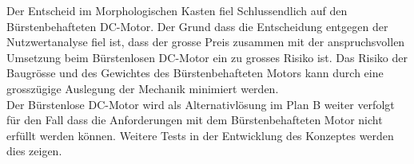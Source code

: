 \documentclass[../../main.tex]{subfiles}
\begin{document}
    Der Entscheid im Morphologischen Kasten fiel Schlussendlich auf den Bürstenbehafteten DC-Motor. Der Grund dass die Entscheidung entgegen der Nutzwertanalyse fiel ist, dass der grosse Preis zusammen mit der anspruchsvollen Umsetzung beim Bürstenlosen DC-Motor ein zu grosses Risiko ist. Das Risiko der Baugrösse und des Gewichtes des Bürstenbehafteten Motors kann durch eine grosszügige Auslegung der Mechanik minimiert werden.\\
    Der Bürstenlose DC-Motor wird als Alternativlösung im Plan B weiter verfolgt für den Fall dass die Anforderungen mit dem Bürstenbehafteten Motor nicht erfüllt werden können. Weitere Tests in der Entwicklung des Konzeptes werden dies zeigen.

    
\end{document}
